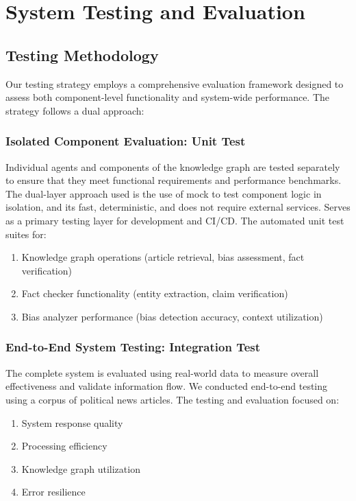 \documentclass[11pt]{article}
\begin{document}
\section{System Testing and Evaluation}
\subsection{Testing Methodology}
Our testing strategy employs a comprehensive evaluation framework designed to assess both component-level functionality and system-wide performance. The strategy follows a dual approach:
\subsubsection{Isolated Component Evaluation: Unit Test}
Individual agents and components of the knowledge graph are tested separately to ensure that they meet functional requirements and performance benchmarks. The dual-layer approach used is the use of mock to test component logic in isolation, and its fast, deterministic, and does not require external services. Serves as a primary testing layer for development and CI/CD. The automated unit test suites for:
\begin{enumerate}
    \item Knowledge graph operations (article retrieval, bias assessment, fact verification)
    \item Fact checker functionality (entity extraction, claim verification)
    \item Bias analyzer performance (bias detection accuracy, context utilization)

\end{enumerate}

\subsubsection{End-to-End System Testing: Integration Test}
The complete system is evaluated using real-world data to measure overall effectiveness and validate information flow. We conducted end-to-end testing using a corpus of political news articles. The testing and evaluation focused on:
\begin{enumerate}
    \item System response quality
    \item Processing efficiency
    \item Knowledge graph utilization
    \item Error resilience 
\end{enumerate}
\end{document}
